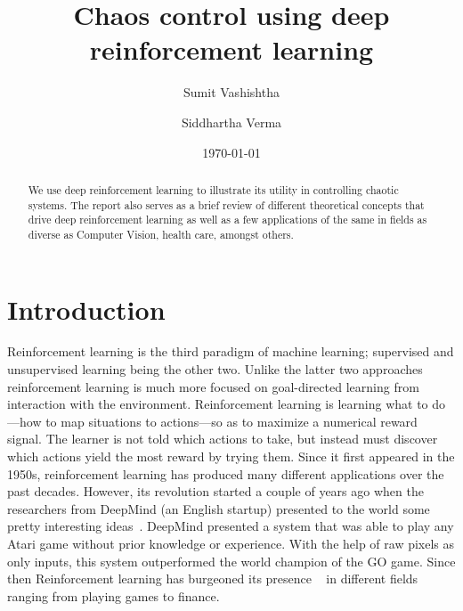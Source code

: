 \documentclass[aps, pre, reprint]{revtex4-1}
\begin{document}
\title{Chaos control using deep reinforcement learning}

\author{Sumit Vashishtha}

\author{Siddhartha Verma}

\date{\today}

\begin{abstract}
    {We use deep reinforcement learning to illustrate its utility in controlling chaotic systems. The report also serves as a brief review of different theoretical concepts that drive deep reinforcement learning as well as a few applications of the same in fields as diverse as Computer Vision,  health care, amongst others.}
 
\end{abstract}

\maketitle
\section{Introduction}
\label{sec:intro}

Reinforcement learning is the third paradigm of machine learning; supervised and unsupervised            learning being the other two. Unlike the latter two approaches reinforcement learning is much more  focused on goal-directed learning from interaction with the environment. Reinforcement learning is learning what to do—how to map situations to actions—so as to maximize a numerical reward signal. The learner is not told which actions to take, but instead must discover which actions yield the most reward by trying them. Since it first appeared in the 1950s, reinforcement learning has produced many different applications over the past decades. However, its revolution started a couple of years ago when the researchers from DeepMind (an English startup) presented to the world some pretty interesting ideas~\cite{silver2016mastering}. DeepMind presented a system that was able to play any Atari game without prior knowledge or
experience. With the help of raw pixels as only inputs, this system outperformed the world champion of the GO game. Since then Reinforcement learning has burgeoned its presence ~\cite{barto2017some} in different fields ranging from playing games to finance.\\
\end{document}
